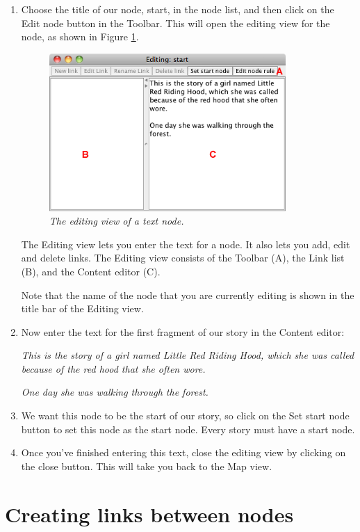 \documentclass{article}
\begin{document}
\begin{enumerate}
  \item Choose the title of our node, start, in the node list, and then click
  on the Edit node button in the Toolbar. This will open the editing view for
  the node, as shown in Figure \ref{fig:tut1:edit_node}. 
  
\begin{figure}[ht]
  \centering
  \includegraphics[width=9cm]{images/hypedyn-tutorial-1-figure-5}
  \caption{\textit{The editing view of a text node.}}
  \label{fig:tut1:edit_node}
\end{figure} 

The Editing view lets you enter the text for a node. It also lets you add, edit
and delete links. The Editing view consists of the Toolbar (A), the Link list (B),
and the Content editor (C).

Note that the name of the node that you are currently editing is shown in the
title bar of the Editing view.

\item Now enter the text for the first fragment of our story in the Content
editor:

\textit{This is the story of a girl named Little Red Riding Hood, which she was
called because of the red hood that she often wore.}

\textit{One day she was walking through the forest.}

\item We want this node to be the start of our story, so click on the Set start
node button to set this node as the start node. Every story must have a start node.
\item Once you've finished entering this text, close the editing view by
clicking on the close button. This will take you back to the Map view.
\end{enumerate}

\section{Creating links between nodes}
\end{document}
